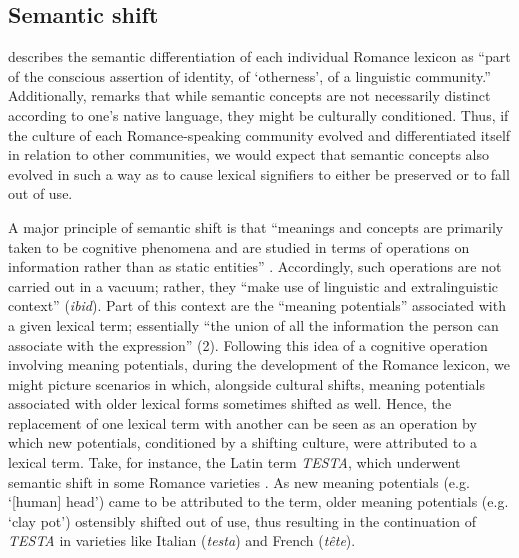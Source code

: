 \documentclass[output=paper,colorlinks,citecolor=brown,
]{langscibook}
\begin{document}
\subsection{Semantic shift}
\citet[320]{posner_romance_1996} describes the semantic differentiation of each individual Romance lexicon as “part of the conscious assertion of identity, of ‘otherness’, of a linguistic community.” Additionally, \citet[233]{glessgen_linguistique_2007} remarks that while semantic concepts are not necessarily distinct according to one’s native language, they might be culturally conditioned. Thus, if the culture of each Romance-speaking community evolved and differentiated itself in relation to other communities, we would expect that semantic concepts also evolved in such a way as to cause lexical signifiers to either be preserved or to fall out of use.

A major principle of semantic shift is that “meanings and concepts are primarily taken to be cognitive phenomena and are studied in terms of operations on information rather than as static entities” \citep[1]{allwood_semantics_1999}. Accordingly, such operations are not carried out in a vacuum; rather, they “make use of linguistic and extralinguistic context” (\textit{ibid}). Part of this context are the “meaning potentials” associated with a given lexical term; essentially “the union of all the information the person can associate with the expression” (2). Following this idea of a cognitive operation involving meaning potentials, during the development of the Romance lexicon, we might picture scenarios in which, alongside cultural shifts, meaning potentials associated with older lexical forms sometimes shifted as well. Hence, the replacement of one lexical term with another can be seen as an operation by which new potentials, conditioned by a shifting culture, were attributed to a lexical term. Take, for instance, the Latin term \textit{TESTA}, which underwent semantic shift in some Romance varieties \citep[245]{glessgen_linguistique_2007}. As new meaning potentials (e.g. ‘[human] head’) came to be attributed to the term, older meaning potentials (e.g. ‘clay pot’) ostensibly shifted out of use, thus resulting in the continuation of \textit{TESTA} in varieties like Italian (\textit{testa}) and French (\textit{tête}).
\end{document}
